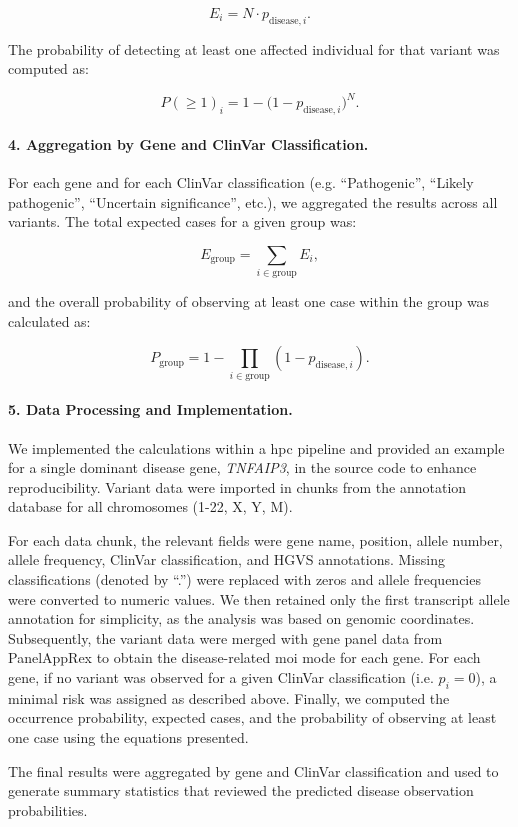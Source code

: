 \[
E_i = N \cdot p_{\text{disease},i}.
\]

The probability of detecting at least one affected individual for that variant was computed as:

\[
P(\geq 1)_i = 1 - \bigl(1 - p_{\text{disease},i}\bigr)^N.
\]

\paragraph{4. Aggregation by Gene and ClinVar Classification.}
For each gene and for each ClinVar classification (e.g. ``Pathogenic'', ``Likely pathogenic'', ``Uncertain significance'', etc.), we aggregated the results across all variants. The total expected cases for a given group was:

\[
E_{\text{group}} = \sum_{i \in \text{group}} E_i,
\]

and the overall probability of observing at least one case within the group was calculated as:

\[
P_{\text{group}} = 1 - \prod_{i \in \text{group}} \left(1 - p_{\text{disease},i}\right).
\]

\paragraph{5. Data Processing and Implementation.}
We implemented the calculations within a \ac{hpc} pipeline and provided an example for a single dominant disease gene, \textit{TNFAIP3}, in the source code to enhance reproducibility. Variant data were imported in chunks from the annotation database for all chromosomes (1-22, X, Y, M). 

For each data chunk, the relevant fields were gene name, position, allele number, allele frequency, ClinVar classification, and HGVS annotations. Missing classifications (denoted by ``.'') were replaced with zeros and allele frequencies were converted to numeric values. We then retained only the first transcript allele annotation for simplicity, as the analysis was based on genomic coordinates. Subsequently, the variant data were merged with gene panel data from PanelAppRex to obtain the disease-related \ac{moi} mode for each gene. For each gene, if no variant was observed for a given ClinVar classification (i.e. \(p_i = 0\)), a minimal risk was assigned as described above. Finally, we computed the occurrence probability, expected cases, and the probability of observing at least one case using the equations presented.

The final results were aggregated by gene and ClinVar classification and used to generate summary statistics that reviewed the predicted disease observation probabilities.


